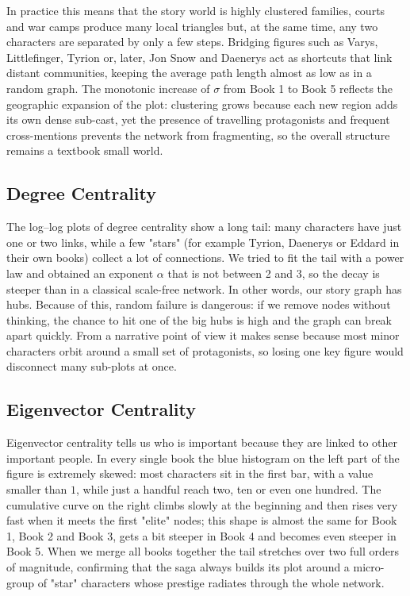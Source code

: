 \documentclass[12pt, a4paper]{article}
\begin{document}
In practice this means that the story world is highly clustered families, 
courts and war camps produce many local triangles but, at the same time, 
any two characters are separated by only a few steps. 
Bridging figures such as Varys, Littlefinger, 
Tyrion or, later, Jon Snow and Daenerys act as 
shortcuts that link distant communities, keeping the average path length almost as low 
as in a random graph.  The monotonic increase of $\sigma$ from Book 1 to Book 5 reflects
 the geographic expansion of the plot: clustering grows because each new region adds its
  own dense sub-cast, yet the presence of travelling protagonists and frequent cross-mentions
   prevents the network from fragmenting, so the overall structure remains a textbook small world.


\subsection*{Degree Centrality} 
The log–log plots of degree centrality show a long tail: many characters have just one or two links, while a few "stars" (for example Tyrion, Daenerys or Eddard in their own books) collect a lot of connections.
We tried to fit the tail with a power law and obtained an exponent $\alpha$ that is not between 2 and 3, so the decay is steeper than in a classical scale-free network. In other words, our story graph has hubs. Because of this, random failure is dangerous: if we remove nodes without thinking, the chance to hit one of the big hubs is high and the graph can break apart quickly. From a narrative point of view it makes sense because most minor characters orbit around a small set of protagonists, so losing one key figure would disconnect many sub-plots at once.
\subsection*{Eigenvector Centrality}
Eigenvector centrality tells us who is important because they are linked to other important people.
In every single book the blue histogram on the left part of the figure is extremely skewed: most characters sit in the first bar, with a value smaller than $1$, while just a handful reach two, ten or even one hundred.  The cumulative curve on the right climbs slowly at the beginning and then rises very fast when it meets the first "elite" nodes; this shape is almost the same for Book 1, Book 2 and Book 3, gets a bit steeper in Book 4 and becomes even steeper in Book 5.  When we merge all books together the tail stretches over two full orders of magnitude, confirming that the saga always builds its plot around a micro-group of "star" characters whose prestige radiates through the whole network.
\end{document}
